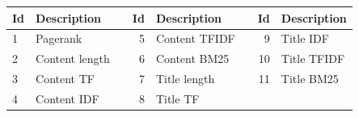 \begin{table}[h]
\centering
{}  \label{tab:setdescription} 
\begin{tabular}{lllrllrl}
\toprule
Id & Description &\qquad & Id & Description &\qquad & Id & Description    \\ 
\midrule
1  & Pagerank  && 5  & Content TFIDF  && 9  & Title IDF   \\
2  & Content length && 6  & Content BM25   && 10 & Title TFIDF   \\
3  & Content TF  && 7  & Title length && 11 & Title BM25  \\
4  & Content IDF && 8  & Title TF  && & \\
\bottomrule
\end{tabular}
\end{table}




